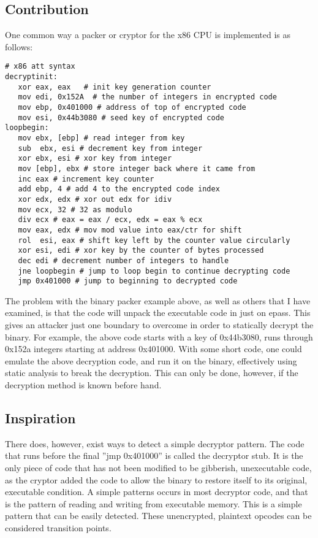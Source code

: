 \documentclass{article}
\begin{document}
\subsection{Contribution}
One common way a packer or cryptor for the x86 CPU is implemented is as follows:
\begin{lstlisting}
# x86 att syntax
decryptinit:
   xor eax, eax   # init key generation counter
   mov edi, 0x152A  # the number of integers in encrypted code
   mov ebp, 0x401000 # address of top of encrypted code
   mov esi, 0x44b3080 # seed key of encrypted code
loopbegin:
   mov ebx, [ebp] # read integer from key
   sub  ebx, esi # decrement key from integer
   xor ebx, esi # xor key from integer
   mov [ebp], ebx # store integer back where it came from
   inc eax # increment key counter
   add ebp, 4 # add 4 to the encrypted code index
   xor edx, edx # xor out edx for idiv
   mov ecx, 32 # 32 as modulo
   div ecx # eax = eax / ecx, edx = eax % ecx
   mov eax, edx # mov mod value into eax/ctr for shift
   rol  esi, eax # shift key left by the counter value circularly
   xor esi, edi # xor key by the counter of bytes processed
   dec edi # decrement number of integers to handle
   jne loopbegin # jump to loop begin to continue decrypting code
   jmp 0x401000 # jump to beginning to decrypted code
\end{lstlisting}
\newline

The problem with the binary packer example above, as well as others that I have examined, is that the code will unpack the executable code in just on epass. This gives an attacker just one boundary to overcome in order to statically decrypt the binary. For example, the above code starts with a key of 0x44b3080, runs through 0x152a integers starting at address 0x401000. With some short code, one could emulate the above decryption code, and run it on the binary, effectively using static analysis to break the decryption. This can only be done, however, if the decryption method is known before hand. \newline

\subsection{Inspiration}
There does, however, exist ways to detect a simple decryptor pattern.  The code that runs before the final ''jmp 0x401000'' is called the decryptor stub. It is the only piece of code that has not been modified to be gibberish, unexecutable code, as the cryptor added the code to allow the binary to restore itself to its original, executable condition. A simple patterns occurs in most decryptor code, and that is the pattern of reading and writing from executable memory. This is a simple  pattern that can be easily detected. These unencrypted, plaintext opcodes can be considered transition points. 
\end{document}
